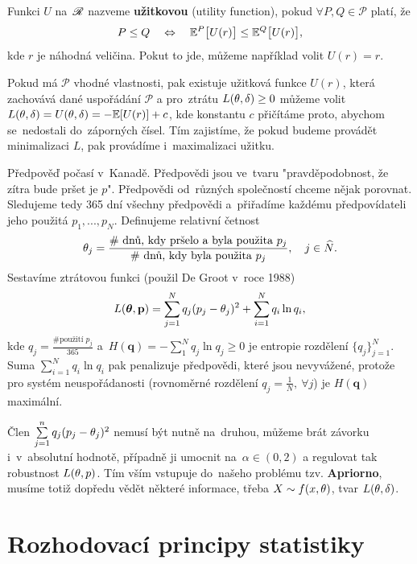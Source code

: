 \begin{define}
	Funkci $U$ na~$\mathscr{R}$ nazveme \textbf{užitkovou} (utility function), pokud $\forall P,Q\in\mathcal{P}$ platí, že 
	$$ P\leq Q\quad\Leftrightarrow\quad\mathbb{E}^P\big[U(r)\big]\leq\mathbb{E}^Q\big[U(r)\big],$$ kde $r$ je náhodná veličina. Pokut to jde, můžeme například volit $U(r)=r$.
\end{define}
\begin{remark}
	Pokud má $\mathcal{P}$ vhodné vlastnosti, pak existuje užitková funkce $U(r)$, která zachovává dané uspořádání $\mathcal{P}$ a pro~ztrátu $L(\theta,\delta)\geq 0$ můžeme volit $L(\theta,\delta)=U(\theta,\delta)=-\mathbb{E}[U(r)]+c$, kde konstantu $c$ přičítáme proto, abychom se~nedostali do~záporných čísel. Tím zajistíme, že pokud budeme provádět minimalizaci $L$, pak provádíme i~maximalizaci užitku.
\end{remark}
\begin{example}[volba L]
		Předpověď počasí v~Kanadě. Předpovědi jsou ve~tvaru "pravděpodobnost, že zítra bude pršet je $p$". Předpovědi od~různých společností chceme nějak porovnat. Sledujeme tedy 365 dní všechny předpovědi a~přiřadíme každému předpovídateli jeho použitá $p_1,...,p_N$. Definujeme relativní četnost $$\theta_j=\frac{\text{\# dnů, kdy pršelo a~byla použita }p_j}{\text{\# dnů, kdy byla použita }p_j},\quad j\in\widehat{N}.$$ Sestavíme ztrátovou funkci (použil De Groot v~roce 1988) $$L(\boldsymbol{\theta},\textbf{p})=\sum_{j=1}^N q_j(p_j-\theta_j)^2+\sum_{i=1}^N q_i\ln q_i,$$ kde $q_j=\frac{\text{\# použití }p_j}{365}$ a~$H(\textbf{q})=-\sum_1^N q_j\ln q_j\geq 0$ je entropie rozdělení $\{q_j\}_{j=1}^N$. Suma $\sum_{i=1}^N q_i\ln q_i$ pak penalizuje předpovědi, které jsou nevyvážené, protože pro systém neuspořádanosti (rovnoměrné rozdělení $q_j=\frac{1}{N},~\forall j$) je $H(\textbf{q})$ maximální.
		
		Člen $\sum\limits_{j=1}^{n} q_j(p_j-\theta_j)^2$ nemusí být nutně na~druhou, můžeme brát závorku i~v~absolutní hodnotě, případně ji umocnit na~$\alpha\in(0,2)$ a regulovat tak robustnost $L(\theta,p)$. Tím vším vstupuje do~našeho problému tzv. \textbf{Apriorno}, musíme totiž dopředu vědět některé informace, třeba $X\sim f(x,\theta)$, tvar $L(\theta,\delta)$. 
\end{example}

\section{Rozhodovací principy statistiky}

